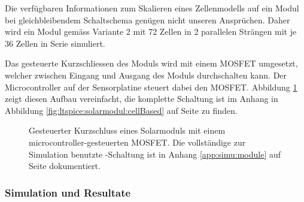 Die  verf\"ugbaren   Informationen  zum  Skalieren  eines   Zellenmodells  auf
ein   Modul  bei   gleichbleibendem  Schaltschema   gen\"ugen  nicht   unseren
Anspr\"uchen. Daher wird  ein Modul  gem\"ass Variante  2 mit  72 Zellen  in 2
parallelen Str\"angen mit je 36  Zellen in Serie simuliert.

Das  gesteuerte Kurzschliessen  des Moduls  wird mit  einem MOSFET  umgesetzt,
welcher  zwischen  Eingang  und  Ausgang des  Moduls  durchschalten  kann. Der
Microcontroller  auf der  Sensorplatine  steuert  dabei den  MOSFET. Abbildung
\ref{fig:module:mosfet:simple} zeigt diesen  Aufbau vereinfacht, die komplette
Schaltung  ist im  Anhang in  Abbildung \ref{fig:ltspice:solarmodul:cellBased}
auf Seite \pageref{fig:ltspice:solarmodul:cellBased} zu finden.

\begin{figure}[h!tb]
    \centering
    
    \caption{%
        Gesteuerter     Kurzschluss     eines    Solarmoduls     mit     einem
        microcontroller-gesteuerten MOSFET. Die  vollst\"andige zur Simulation
        benutzte -Schaltung ist  in Anhang \ref{app:simu:module}
        auf Seite \pageref{fig:ltspice:solarmodul:cellBased} dokumentiert.%
    }
    \label{fig:module:mosfet:simple}
\end{figure}


\subsubsection{Simulation und Resultate}
\label{subsubsec:hw:ask:simu}


